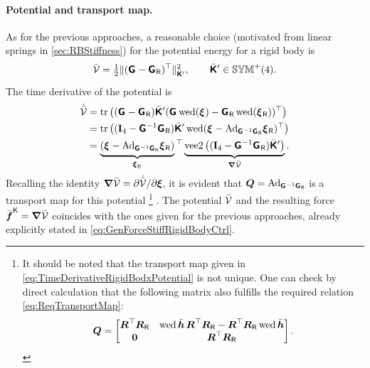 \paragraph{Potential and transport map.}
As for the previous approaches, a reasonable choice (motivated from linear springs in \autoref{sec:RBStiffness}) for the potential energy for a rigid body is
\begin{align}\label{eq:PotentialRigidBodyAppOne}
 \potentialEnergyC = \tfrac{1}{2} \norm[\bodyStiffMatCp{}{}]{ (\bodyHomoCoord{}{} - \bodyHomoCoordR{}{} )^\top}^2,
\qquad
 \bodyStiffMatCp{}{} \in \SymMatP(4).
\end{align}
The time derivative of the potential is
\begin{align}\label{eq:TimeDerivativeRigidBodxPotential}
 \dot{\potentialEnergyC} &= \tr \big( (\bodyHomoCoord{}{} - \bodyHomoCoordR{}{}) \bodyStiffMatCp{}{} (\bodyHomoCoord{}{} \wedOp(\bodyVel{}{}) - \bodyHomoCoordR{}{} \wedOp(\bodyVelR{}{}))^\top \big)
 \nonumber\\
 &= \tr \big( (\idMat[4] - \bodyHomoCoord{}{}^{-1}\bodyHomoCoordR{}{}) \bodyStiffMatCp{}{} \wedOp(\bodyVel{}{} - \Ad{\bodyHomoCoord{}{}^{-1}\bodyHomoCoordR{}{}} \bodyVelR{}{})^\top \big)
\nonumber\\
 &= \underbrace{(\bodyVel{}{} - \Ad{\bodyHomoCoord{}{}^{-1}\bodyHomoCoordR{}{}} \bodyVelR{}{})}_{\sysVelE}\vphantom{|}^\top \underbrace{\veeTwoOp\big( (\idMat[4] - \bodyHomoCoord{}{}^{-1}\bodyHomoCoordR{}{}) \bodyStiffMatCp{}{} \big)}_{\differential \potentialEnergyC}.
\end{align}
Recalling the identity $\differential \potentialEnergyC = \spdiff[\dot{\potentialEnergyC}]{\sysVel}$, it is evident that $\sysTransportMap = \Ad{\bodyHomoCoord{}{}^{-1}\bodyHomoCoordR{}{}}$ is a transport map for this potential
\footnote{
It should be noted that the transport map given in \eqref{eq:TimeDerivativeRigidBodxPotential} is not unique.
One can check by direct calculation that the following matrix also fulfills the required relation \eqref{eq:ReqTransportMap}:
\begin{align}\label{eq:RigidBodyAlternativeTransportMap}
 \sysTransportMap = \begin{bmatrix} \R^\top\RR & \wedOp\hc\,\R^\top\RR - \R^\top\RR \wedOp\hc \\ \mat{0} & \R^\top\RR \end{bmatrix}.
\end{align}
}
.
The potential $\potentialEnergyC$ and the resulting force $\genForceStiffC = \differential \potentialEnergyC $ coincides with the ones given for the previous approaches, already explicitly stated in \eqref{eq:GenForceStiffRigidBodyCtrl}.

